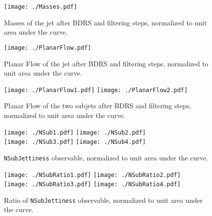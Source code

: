 \begin{figure}
    \begin{center}
        \texttt{[image: ./Masses.pdf]}
        \caption{ Masses of the jet after BDRS and filtering steps, normalized to unit area under the curve. }
        \label{fig:Masses}
    \end{center}
\end{figure}

\begin{figure}
    \begin{center}
        \texttt{[image: ./PlanarFlow.pdf]}
        \caption{ Planar Flow of the jet after BDRS and filtering steps, normalized to unit area under the curve. }
        \label{fig:PlanarFlow}
    \end{center}
\end{figure}

\begin{figure}
    \begin{center}
        \texttt{[image: ./PlanarFlow1.pdf]}
        \texttt{[image: ./PlanarFlow2.pdf]}\\
        \caption{ Planar Flow of the two subjets after BDRS and filtering steps, normalized to unit area under the curve. }
        \label{fig:PlanarFlowX}
    \end{center}
\end{figure}

\begin{figure}
    \begin{center}
        \texttt{[image: ./NSub1.pdf]}
        \texttt{[image: ./NSub2.pdf]}\\
        \texttt{[image: ./NSub3.pdf]}
        \texttt{[image: ./NSub4.pdf]}\\
        \caption{ {\tt NSubJettiness} observable, normalized to unit area under the curve. }
        \label{fig:NSub}
    \end{center}
\end{figure}

\begin{figure}
    \begin{center}
        \texttt{[image: ./NSubRatio1.pdf]}
        \texttt{[image: ./NSubRatio2.pdf]}\\
        \texttt{[image: ./NSubRatio3.pdf]}
        \texttt{[image: ./NSubRatio4.pdf]}\\
        \caption{ Ratio of {\tt NSubJettiness} observable, normalized to unit area under the curve. }
        \label{fig:NSubRatio}
    \end{center}
\end{figure}
